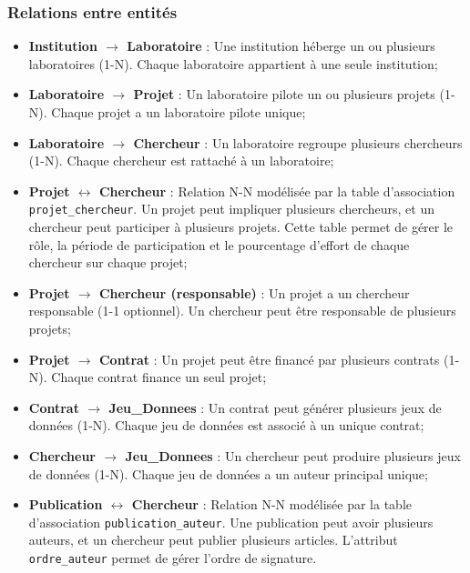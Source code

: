\documentclass[12pt,a4paper]{article}
\begin{document}
\subsubsection{Relations entre entités}
\begin{itemize}
    \item \textbf{Institution $\rightarrow$ Laboratoire} : Une institution héberge un ou plusieurs laboratoires (1-N). Chaque laboratoire appartient à une seule institution;
    
    \item \textbf{Laboratoire $\rightarrow$ Projet} : Un laboratoire pilote un ou plusieurs projets (1-N). Chaque projet a un laboratoire pilote unique;
    
    \item \textbf{Laboratoire $\rightarrow$ Chercheur} : Un laboratoire regroupe plusieurs chercheurs (1-N). Chaque chercheur est rattaché à un laboratoire;
    
    \item \textbf{Projet $\leftrightarrow$ Chercheur} : Relation N-N modélisée par la table d'association \texttt{projet\_chercheur}. Un projet peut impliquer plusieurs chercheurs, et un chercheur peut participer à plusieurs projets. Cette table permet de gérer le rôle, la période de participation et le pourcentage d'effort de chaque chercheur sur chaque projet;
    
    \item \textbf{Projet $\rightarrow$ Chercheur (responsable)} : Un projet a un chercheur responsable (1-1 optionnel). Un chercheur peut être responsable de plusieurs projets;
    
    \item \textbf{Projet $\rightarrow$ Contrat} : Un projet peut être financé par plusieurs contrats (1-N). Chaque contrat finance un seul projet;
    
    \item \textbf{Contrat $\rightarrow$ Jeu\_Donnees} : Un contrat peut générer plusieurs jeux de données (1-N). Chaque jeu de données est associé à un unique contrat;
    
    \item \textbf{Chercheur $\rightarrow$ Jeu\_Donnees} : Un chercheur peut produire plusieurs jeux de données (1-N). Chaque jeu de données a un auteur principal unique;
    
    \item \textbf{Publication $\leftrightarrow$ Chercheur} : Relation N-N modélisée par la table d'association \texttt{publication\_auteur}. Une publication peut avoir plusieurs auteurs, et un chercheur peut publier plusieurs articles. L'attribut \texttt{ordre\_auteur} permet de gérer l'ordre de signature.
\end{itemize}
\end{document}
